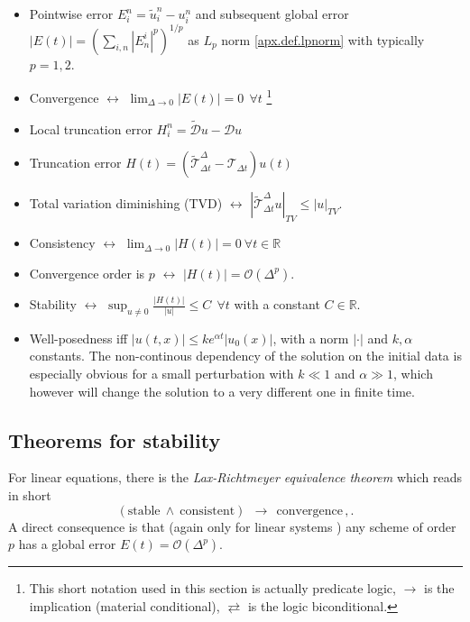 \begin{itemize}
	\item
	Pointwise error $E_i^n = \tilde u_i^n - u_i^n$ and subsequent
	global error $|E(t)|= \left( \sum_{i,n} |E^i_n|^p \right)^{1/p}$ as $L_p$ 
	norm \eqref{apx.def.lpnorm} with typically $p=1,2$.
	
	\item
	Convergence $\leftrightarrow$ $\lim_{\Delta\to 0} |E(t)|=0 ~~\forall t$
	\footnote{
		This short notation used in this section is actually predicate logic,
		$\rightarrow$ is the implication (material conditional),
		$\rightleftarrows$ is the logic biconditional.
	}
	
	\item
	Local truncation error $H_i^n = \mathcal{\tilde D}u - 
	\mathcal D u$
	
	\item
    Truncation error $H(t) = \left( \mathcal{\tilde T}^{\Delta}_{\Delta 
	t} - \mathcal T_{\Delta t} \right) u(t)$

    \item Total variation diminishing (TVD) $\leftrightarrow$
    $|\mathcal{\tilde T}_{\Delta t}^\Delta u|_{TV} \leq |u|_{TV}$.
	
	\item
	Consistency $\leftrightarrow$ $\lim_{\Delta\to 0} |H(t)|=0 ~\forall t \in \mathbb R$
	
	\item
	Convergence order is $p$ $\leftrightarrow$ $|H(t)| = \mathcal{O}(\Delta^p)$.
	
	\item
	Stability $\leftrightarrow$ $\sup_{u\neq 0} \frac{|H(t)|}{|u|} \leq C ~~
	\forall t$ with a constant $C \in \mathbb R$.
	
    \item
    Well-posedness iff $| u(t,x) | \leq k e^{\alpha t} |u_0(x)|$, with a norm
      $|\cdot|$ and $k, \alpha$ constants. The non-continous dependency of the
      solution on the initial data is especially obvious for a small
      perturbation with $k \ll 1$ and $\alpha\gg 1$, which however will change
      the solution to a very different one in finite time.
\end{itemize}


\subsection*{Theorems for stability}

For linear equations, there is the \emph{Lax-Richtmeyer equivalence theorem}
which reads in short \cite{Lax1956,Richtmyer94}
\begin{equation}
(\text{stable}~\wedge~\text{consistent})~~\rightarrow~~\text{convergence}
\,,.
\end{equation}
A direct consequence is that (again only for linear systems ) any scheme of
order $p$ has a global error $E(t)=\mathcal{O}(\Delta^p)$.

